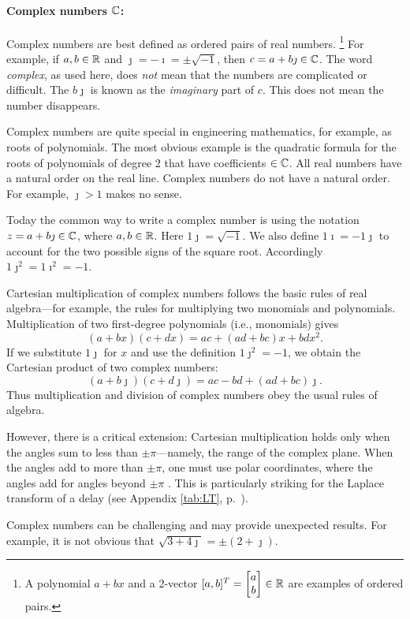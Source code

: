 \documentclass{ximera}
\begin{document}
\paragraph{Complex numbers $\mathbb{C}$: \label{page:bbC} }
Complex numbers are best defined as ordered pairs of real numbers.%
 \footnote{A polynomial $a+bx$ and a 2-vector $[a,b]^T = \begin{bmatrix} a\\b \end{bmatrix} \in \mathbb{R}$ are examples of ordered pairs.}
For example, if $a,b \in \mathbb{R}$ and $\jmath=-\imath=\pm\sqrt{-1}$, then $c=a+b\jmath \in\mathbb{C}$.
The word \emph{complex}, as used here, does \emph{not} mean that the numbers are complicated or difficult. 
The $b\jmath$ is known as the \emph{imaginary} part of $c$. This does not mean the number disappears. 

Complex numbers are quite special in engineering mathematics, for example, as roots of polynomials.
The most obvious example is the quadratic formula for the roots of polynomials of degree 2 that have coefficients $\in\mathbb{C}$.
All real numbers have a natural order on the real line. Complex numbers do not have a natural order.
For example, $\jmath > 1$ makes no sense.

Today the common way to write a complex number is using the notation $z=a+b\jmath \in \mathbb{C}$, where
${a,b} \in \mathbb{R}$.  Here $1\jmath=\sqrt{-1}$.  We also define $1\imath=-1\jmath$ to account for the
two possible signs of the square root.  Accordingly $1\jmath^2 = 1\imath^2 = -1$.

Cartesian multiplication of complex numbers follows the basic rules of real algebra---for example, the rules
for multiplying two monomials and polynomials.  Multiplication of two first-degree polynomials (i.e.,
monomials) gives 
 \[
(a+bx)(c+dx) = ac + (ad+bc)x + bdx^2.
\]
If we substitute $1\jmath$ for $x$ and use the definition $1\jmath^2=-1$, we obtain the Cartesian product
of two complex numbers:
 \[
(a+b\jmath)(c+d\jmath) = ac-bd + (ad+bc)\jmath.
\]
Thus multiplication and division of complex numbers obey the usual rules of algebra. 

However, there is a critical extension:
Cartesian multiplication holds only when the angles sum to less than $\pm\pi$---namely, the range of the complex plane. 
When the angles add to more than $\pm \pi$, one must use polar coordinates,
where the angles add for angles beyond $\pm \pi$ \citep[p.~8]{Boas87}. 
This is particularly striking for the Laplace transform of a delay (see Appendix \ref{tab:LT}, p.~\pageref{tab:LT}).

Complex numbers can be challenging and may provide unexpected results.  For example, it is not obvious that
$\sqrt{3+4\jmath}= \pm (2+\jmath)$.
\end{document}
